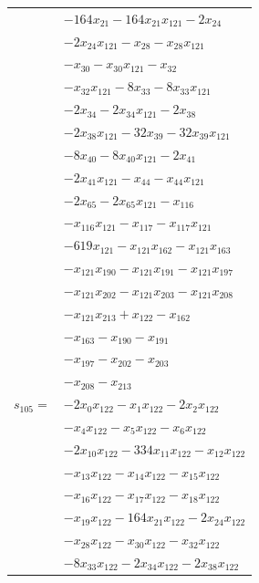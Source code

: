 \begin{longtable}{@{}r@{\;}l@{}}
 & \(\displaystyle -164x_{21} -164x_{21}x_{121} -2x_{24}\) \\
 & \(\displaystyle -2x_{24}x_{121} -x_{28} -x_{28}x_{121}\) \\
 & \(\displaystyle -x_{30} -x_{30}x_{121} -x_{32}\) \\
 & \(\displaystyle -x_{32}x_{121} -8x_{33} -8x_{33}x_{121}\) \\
 & \(\displaystyle -2x_{34} -2x_{34}x_{121} -2x_{38}\) \\
 & \(\displaystyle -2x_{38}x_{121} -32x_{39} -32x_{39}x_{121}\) \\
 & \(\displaystyle -8x_{40} -8x_{40}x_{121} -2x_{41}\) \\
 & \(\displaystyle -2x_{41}x_{121} -x_{44} -x_{44}x_{121}\) \\
 & \(\displaystyle -2x_{65} -2x_{65}x_{121} -x_{116}\) \\
 & \(\displaystyle -x_{116}x_{121} -x_{117} -x_{117}x_{121}\) \\
 & \(\displaystyle -619x_{121} -x_{121}x_{162} -x_{121}x_{163}\) \\
 & \(\displaystyle -x_{121}x_{190} -x_{121}x_{191} -x_{121}x_{197}\) \\
 & \(\displaystyle -x_{121}x_{202} -x_{121}x_{203} -x_{121}x_{208}\) \\
 & \(\displaystyle -x_{121}x_{213} +x_{122} -x_{162}\) \\
 & \(\displaystyle -x_{163} -x_{190} -x_{191}\) \\
 & \(\displaystyle -x_{197} -x_{202} -x_{203}\) \\
 & \(\displaystyle -x_{208} -x_{213}\) \\[3pt]
\(s_{105}=\) & \(\displaystyle -2x_{0}x_{122} -x_{1}x_{122} -2x_{2}x_{122}\) \\
 & \(\displaystyle -x_{4}x_{122} -x_{5}x_{122} -x_{6}x_{122}\) \\
 & \(\displaystyle -2x_{10}x_{122} -334x_{11}x_{122} -x_{12}x_{122}\) \\
 & \(\displaystyle -x_{13}x_{122} -x_{14}x_{122} -x_{15}x_{122}\) \\
 & \(\displaystyle -x_{16}x_{122} -x_{17}x_{122} -x_{18}x_{122}\) \\
 & \(\displaystyle -x_{19}x_{122} -164x_{21}x_{122} -2x_{24}x_{122}\) \\
 & \(\displaystyle -x_{28}x_{122} -x_{30}x_{122} -x_{32}x_{122}\) \\
 & \(\displaystyle -8x_{33}x_{122} -2x_{34}x_{122} -2x_{38}x_{122}\) \\

\end{longtable}
